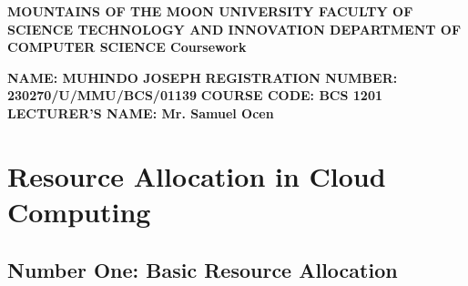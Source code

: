 \documentclass[a4paper,11pt,center]{article}
\begin{document}
\begin{center}
	\textbf{MOUNTAINS OF THE MOON UNIVERSITY\newline\newline\newline
		FACULTY OF SCIENCE TECHNOLOGY\newline\newline\newline
	    AND INNOVATION\newline\newline\newline
		DEPARTMENT OF COMPUTER SCIENCE\newline\newline\newline
		Coursework}\newline\newline\newline
\end{center}
		

	
\textbf{NAME: MUHINDO JOSEPH }\newline\newline
	\textbf{REGISTRATION NUMBER: 230270/U/MMU/BCS/01139}\newline\newline
	\textbf{COURSE CODE: BCS 1201}\newline\newline
	\textbf{LECTURER'S NAME: Mr. Samuel Ocen}

\newpage


\section{Resource Allocation in Cloud 
	Computing}
\subsection{\textbf{Number One: Basic Resource Allocation}}
\end{document}
